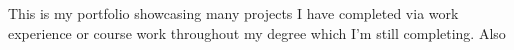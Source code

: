 This is my portfolio showcasing many projects I have completed via work experience or course work throughout my degree which I'm still completing. 
Also  